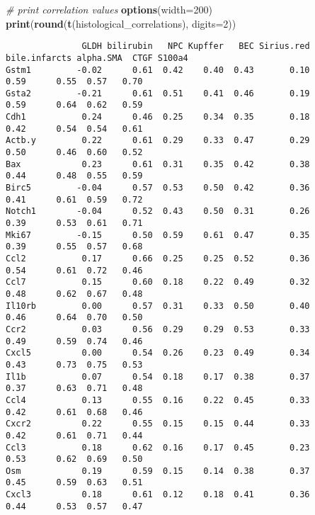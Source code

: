 \documentclass[]{article}
\newenvironment{Shaded}{\begin{snugshade}}{\end{snugshade}}
\newcommand{\KeywordTok}[1]{\textcolor[rgb]{0.13,0.29,0.53}{\textbf{{#1}}}}
\newcommand{\DataTypeTok}[1]{\textcolor[rgb]{0.13,0.29,0.53}{{#1}}}
\newcommand{\DecValTok}[1]{\textcolor[rgb]{0.00,0.00,0.81}{{#1}}}
\newcommand{\CommentTok}[1]{\textcolor[rgb]{0.56,0.35,0.01}{\textit{{#1}}}}
\newcommand{\NormalTok}[1]{{#1}}
\begin{document}
\small

\begin{Shaded}
\begin{Highlighting}[]
\CommentTok{# print correlation values}
\KeywordTok{options}\NormalTok{(}\DataTypeTok{width=}\DecValTok{200}\NormalTok{)}
\KeywordTok{print}\NormalTok{(}\KeywordTok{round}\NormalTok{(}\KeywordTok{t}\NormalTok{(histological_correlations), }\DataTypeTok{digits=}\DecValTok{2}\NormalTok{))}
\end{Highlighting}
\end{Shaded}

\begin{verbatim}
               GLDH bilirubin   NPC Kupffer   BEC Sirius.red bile.infarcts alpha.SMA  CTGF S100a4
Gstm1         -0.02      0.61  0.42    0.40  0.43       0.10          0.59      0.55  0.57   0.70
Gsta2         -0.21      0.61  0.51    0.41  0.46       0.19          0.59      0.64  0.62   0.59
Cdh1           0.24      0.46  0.25    0.34  0.35       0.18          0.42      0.54  0.54   0.61
Actb.y         0.22      0.61  0.29    0.33  0.47       0.29          0.50      0.46  0.60   0.52
Bax            0.23      0.61  0.31    0.35  0.42       0.38          0.44      0.48  0.55   0.59
Birc5         -0.04      0.57  0.53    0.50  0.42       0.36          0.41      0.61  0.59   0.72
Notch1        -0.04      0.52  0.43    0.50  0.31       0.26          0.39      0.53  0.61   0.71
Mki67         -0.15      0.50  0.59    0.61  0.47       0.35          0.39      0.55  0.57   0.68
Ccl2           0.17      0.66  0.25    0.25  0.52       0.36          0.54      0.61  0.72   0.46
Ccl7           0.15      0.60  0.18    0.22  0.49       0.32          0.48      0.62  0.67   0.48
Il10rb         0.00      0.57  0.31    0.33  0.50       0.40          0.46      0.64  0.70   0.50
Ccr2           0.03      0.56  0.29    0.29  0.53       0.33          0.49      0.59  0.74   0.46
Cxcl5          0.00      0.54  0.26    0.23  0.49       0.34          0.43      0.73  0.75   0.53
Il1b           0.07      0.54  0.18    0.17  0.38       0.37          0.37      0.63  0.71   0.48
Ccl4           0.13      0.55  0.16    0.22  0.45       0.33          0.42      0.61  0.68   0.46
Cxcr2          0.22      0.55  0.15    0.15  0.44       0.33          0.42      0.61  0.71   0.44
Ccl3           0.18      0.62  0.16    0.17  0.45       0.23          0.53      0.62  0.69   0.50
Osm            0.19      0.59  0.15    0.14  0.38       0.37          0.45      0.59  0.63   0.51
Cxcl3          0.18      0.61  0.12    0.18  0.41       0.36          0.44      0.53  0.57   0.47

\end{verbatim}
\end{document}
